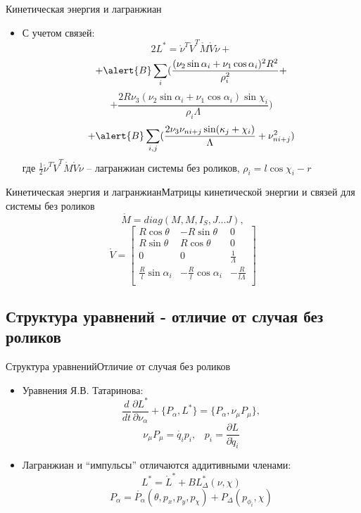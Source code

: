 \documentclass{beamer}
\begin{document}
\begin{frame}{Кинетическая энергия и лагранжиан}
  \begin{itemize}
  \item {
    С учетом связей:
    $$ 2L^{*} = \mathring{\nu}^T \mathring{V}^T \mathring{M} \mathring{V} \mathring{\nu} + $$
    $$ + \alert{B}\sum_{i}(
    	\frac{(\nu_2\sin\alpha_i+\nu_1\cos\alpha_i)^2R^2}
    	{\rho_i^2} + $$
    $$ +
    	\frac{2R\nu_3(\nu_2\sin\alpha_i+\nu_1\cos\alpha_i)\sin\chi_i}
    	{\rho_i\Lambda}
    ) $$
    $$ +
    \alert{B}\sum_{i,j}(
    	\frac{2\nu_3\nu_{ni+j}\sin(\kappa_j+\chi_i)}
    	{\Lambda}
    	+
    	\nu_{ni+j}^2
    )
    $$
    где $ \frac{1}{2}\mathring{\nu}^T \mathring{V}^T \mathring{M} \mathring{V} \mathring{\nu} $ -- лагранжиан системы без роликов, $\rho_i = l\cos\chi_i - r$
  }

  \end{itemize}
\end{frame}

\begin{frame}{Кинетическая энергия и лагранжиан}{Матрицы кинетической энергии и связей для системы без роликов}
    $$ \mathring{M} = diag(M, M, I_S, J...J), $$
    $$ \mathring{V} = \begin{bmatrix}
        R\cos\theta & -R\sin\theta & 0 \\
        R\sin\theta & R\cos\theta  & 0 \\
        0           & 0            & \frac{1}{\Lambda} \\
        \frac{R}{l}\sin\alpha_i & -\frac{R}{l}\cos\alpha_i & -\frac{R}{l\Lambda} \\
    \end{bmatrix} $$
\end{frame}

\subsection{Структура уравнений - отличие от случая без роликов}

\begin{frame}{Структура уравнений}{Отличие от случая без роликов}
  \begin{itemize}
  \item {
    Уравнения Я.В. Татаринова:
    $$ \frac{d}{dt}\frac{\partial L^{*}}{\partial \nu_\alpha}  + \{P_\alpha, L^{*}\} = \{P_\alpha, \nu_\mu P_\mu\}, $$
    $$ \nu_\mu P_\mu = \dot{q_i} p_i, \hspace{10pt} p_i = \frac{\partial L}{\partial \dot{q}_i} $$
  }
  \item {
    Лагранжиан и ``импульсы'' отличаются аддитивными членами:
    $$ L^{*} = \mathring{L}^{*} + BL^{*}_\Delta(\nu, \chi) $$
    $$ P_\alpha = \mathring{P_\alpha}(\theta, p_x, p_y, p_\chi) + P_\Delta(p_{\phi_i}, \chi) $$
  }

  \end{itemize}
\end{frame}
\end{document}
